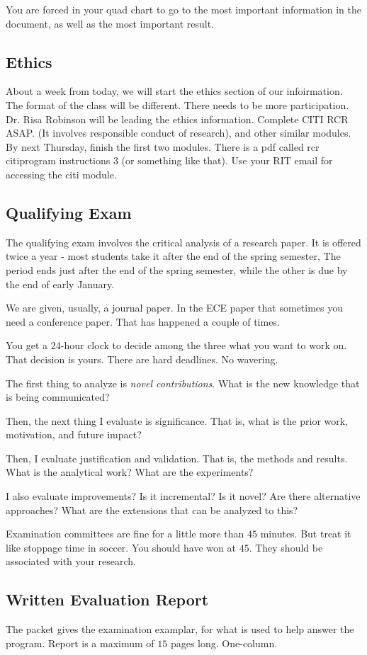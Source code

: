 \documentclass[10pt, oneside]{article}
\begin{document}
You are forced in your quad chart to go to the most important information in the document, as well as the most important result.
\subsection{Ethics}
About a week from today, we will start the ethics section of our infoirmation. The format of the class will be different. There needs to be more participation. Dr. Risa Robinson will be leading the ethics information. 
Complete CITI RCR ASAP. (It involves responsible conduct of research), and other similar modules. By next Thursday, finish the first two modules. There is a pdf called rcr citiprogram instructions 3 (or something like that). Use your RIT email for accessing the citi module.
\subsection{Qualifying Exam}
The qualifying exam involves the critical analysis of a research paper. It is offered twice a year - most students take it after the end of the spring semester, The period ends just after the end of the spring semester, while the other is due by the end of early January. 

We are given, usually, a journal paper. In the ECE paper that sometimes you need a conference paper. That has happened a couple of times. 

You get a 24-hour clock to decide among the three what you want to work on. That decision is yours. 
There are hard deadlines. No wavering. 

The first thing to analyze is \textit{novel contributions}. What is the new knowledge that is being communicated?

Then, the next thing I evaluate is significance. That is, what is the prior work, motivation, and future impact? 

Then, I evaluate justification and validation. That is, the methods and results. What is the analytical work? What are the experiments? 

I also evaluate improvements? Is it incremental? Is it novel? Are there alternative approaches? What are the extensions that can be analyzed to this?

Examination committees are fine for a little more than $45$ minutes. But treat it like stoppage time in soccer. You should have won at $45$. They should be associated with your research. 

\subsection{Written Evaluation Report}
The packet gives the examination examplar, for what is used to help answer the program. Report is a maximum of $15$ pages long. One-column. 
\end{document}
